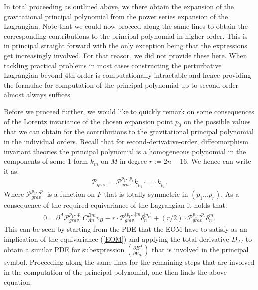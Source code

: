 In total proceeding as outlined above, we there obtain the expansion of the gravitational principal polynomial from the power series expansion of the Lagrangian.
Note that we could now proceed along the same lines to obtain the corresponding contributions to the principal polynomial in higher order. This is in principal straight forward with the only exception being that the expressions get increasingly involved. For that reason, we did not provide these here. When tackling practical problems in most cases constructing the perturbative Lagrangian beyond $4$th order is computationally intractable and hence providing the formulae for computation of the principal polynomial up to second order almost always suffices.

Before we proceed further, we would like to quickly remark on some consequences of the Lorentz invariance of the chosen expansion point $p_0$ on the possible values that we can obtain for the contributions to the gravitational principal polynomial in the individual orders. Recall that for second-derivative-order, diffeomorphism invariant theories the principal polynomial is a homogeneous polynomial in the components of some 1-form $k_m$ on $M$ in degree $r := 2n-16$. We hence can write it as:
\begin{align}
    \mathcal{P}_{grav} = \mathcal{P}_{grav}^{{p_1}...{p_{r}}} k_{p_1} \cdot ... \cdot k_{p_r}.
\end{align}
Where $\mathcal{P}_{grav}^{{p_1}...{p_r}}$ is a function on $F$ that is totally symmetric in $(p_1...p_r)$. As a consequence of the required equivariance of the Lagrangian it holds that:
\begin{align}\label{polyEqn}
    0 = \partial^A\mathcal{P}_{grav}^{{p_1}...{p_r}}C_{An}^{Bm}v_B - r \cdot \mathcal{P}_{grav}^{({p_1}...\vert m} \delta_{n}^{\vert p_r) }  + (r/2) \cdot \mathcal{P}_{grav}^{{p_1}...{p_r}} \delta^m_n.
\end{align}
%
%
%
This can be seen by starting from the PDE that the EOM have to satisfy as an implication of the equivariance (\ref{EOM}) and applying the total derivative $D_{AI}$ to obtain a similar PDE for subexpression $\left ( \frac{\partial E^A}{\partial V_{BI}} \right )$ that is involved in the principal symbol. Proceeding along the same lines for the remaining steps that are involved in the computation of the principal polynomial, one then finds the above equation. 

